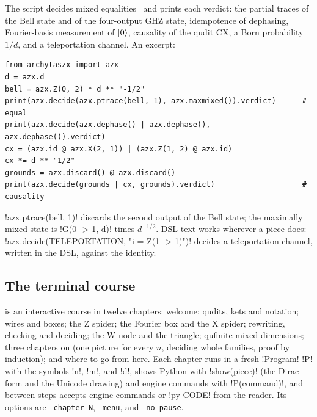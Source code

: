 The script  decides mixed equalities~\cite{carette2019mixed,selinger2007cpm} and prints each verdict: the partial traces of the Bell state and of the four-output GHZ state, idempotence of dephasing, Fourier-basis measurement of $\lvert 0 \rangle$, causality of the qudit CX, a Born probability $1/d$, and a teleportation channel. An excerpt:
\begin{lstlisting}[style=python]
from archytaszx import azx
d = azx.d
bell = azx.Z(0, 2) * d ** "-1/2"
print(azx.decide(azx.ptrace(bell, 1), azx.maxmixed()).verdict)      # equal
print(azx.decide(azx.dephase() | azx.dephase(), azx.dephase()).verdict)
cx = (azx.id @ azx.X(2, 1)) | (azx.Z(1, 2) @ azx.id)
cx *= d ** "1/2"
grounds = azx.discard() @ azx.discard()
print(azx.decide(grounds | cx, grounds).verdict)                    # causality
\end{lstlisting}
\py!azx.ptrace(bell, 1)! discards the second output of the Bell state; the maximally mixed state is \code!G(0 -> 1, d)! times $d^{-1/2}$. DSL text works wherever a piece does: \code!azx.decide(TELEPORTATION, "i = Z(1 -> 1)")! decides a teleportation channel, written in the DSL, against the identity.

\subsection{The terminal course}

 is an interactive course in twelve chapters: welcome; qudits, kets and notation; wires and boxes; the Z spider; the Fourier box and the X spider; rewriting, checking and deciding; the W node and the triangle; qufinite mixed dimensions; three chapters on \bboxes{} (one picture for every $n$, deciding whole families, proof by induction); and where to go from here. Each chapter runs in a fresh \py!Program! \py!P! with the symbols \py!n!, \py!m!, and \py!d!, shows Python with \py!show(piece)! (the Dirac form and the Unicode drawing) and engine commands with \py!P(command)!, and between steps accepts engine commands or \code!py CODE! from the reader. Its options are \texttt{--chapter N}, \texttt{--menu}, and \texttt{--no-pause}.
